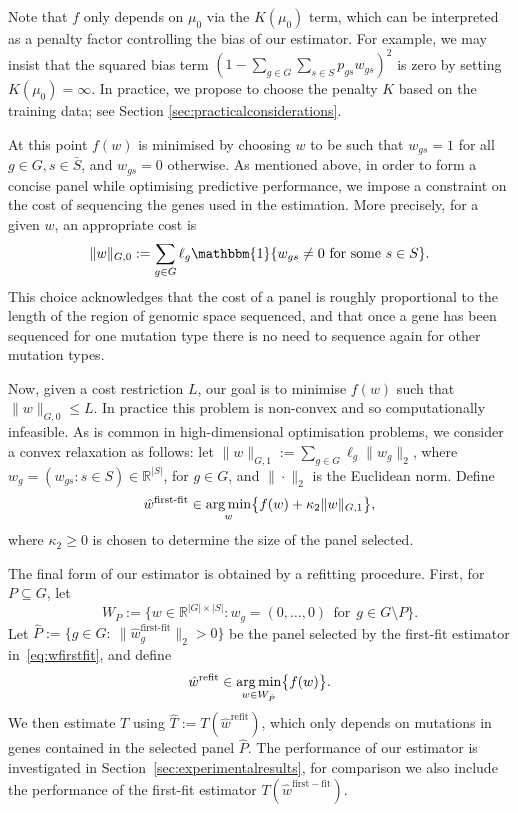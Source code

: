 \documentclass[../thesis.tex]{subfiles}
\begin{document}
Note that $f$ only depends on $\mu_0$ via the $K(\mu_0)$ term, which can be interpreted as a penalty factor controlling the bias of our estimator. For example, we may insist that the squared bias term $(1 - \sum_{g \in G}\sum_{s \in S}  p_{gs}w_{gs})^2$ is zero by setting $K(\mu_0) = \infty$. In practice, we propose to choose the penalty $K$ based on the training data; see Section \ref{sec:practicalconsiderations}. 

At this point $f(w)$ is minimised by choosing $w$ to be such that $w_{gs}= 1$ for all $g\in G, s\in\bar{S}$, and $w_{gs} = 0$ otherwise. As mentioned above, in order to form a concise panel while optimising predictive performance, we impose a constraint on the cost of sequencing the genes used in the estimation. More precisely, for a given $w$, an appropriate cost is
\[
\|w\|_{G,0} := \sum_{g \in G} \ell_g\mathbbm{1}\{w_{gs} \neq 0 \ \mathrm{for \ some \ } s \in S \} .
\]
This choice acknowledges that the cost of a panel is roughly proportional to the length of the region of genomic space sequenced, and that once a gene has been sequenced for one mutation type there is no need to sequence again for other mutation types. 

Now, given a cost restriction $L$, our goal is to minimise $f(w)$ such that $\|w\|_{G,0} \leq L$. In practice this problem is non-convex and so computationally infeasible. As is common in high-dimensional optimisation problems, we consider a convex relaxation as follows: let $\|w\|_{G,1} := \sum_{g \in G} \ell_g \|w_g\|_2$, where $w_g = (w_{gs}: s\in S) \in \mathbb{R}^{|S|}$, for $g \in G$,  and $\|\cdot\|_2$ is the Euclidean norm.  Define
\begin{equation}
    \label{eq:wfirstfit}
\hat{w}^{\text{first-fit}} \in \operatorname*{arg\,min}\limits_{w} \bigl\{ f(w) +\kappa_2\|w\|_{G,1} \bigr\},
\end{equation}
where $\kappa_2 \geq 0$ is chosen to determine the size of the panel selected.

The final form of our estimator is obtained by a refitting procedure. First, for $P\subseteq G$, let
\begin{equation}
    \label{eq:Wp}
W_{P} := \{ w \in \mathbb{R}^{|G| \times |S|} : w_g = (0, \ldots, 0) \ \ \text{for} \ \ g \in G\setminus P \}.
\end{equation}
Let $\hat{P} := \{g \in G: \ \|\hat{w}^{\text{first-fit}}_g\|_2 > 0 \}$ be the panel selected by the first-fit estimator in~\eqref{eq:wfirstfit}, and define  
\begin{equation} 
\label{eq:wrefit}
\hat{w}^{\text{refit}} \in  \operatorname*{arg\,min}\limits_{w \in W_{\hat{P}}} \bigl\{f(w)\bigr\}.
\end{equation}
We then estimate $T$ using $\hat{T} := T(\hat{w}^{\text{refit}})$, which only depends on mutations in genes contained in the selected panel $\hat{P}$.  The performance of our estimator is investigated in Section~\ref{sec:experimentalresults}, for comparison we also include the performance of the first-fit estimator $T(\hat{w}^{\mathrm{first-fit}})$.
\end{document}
